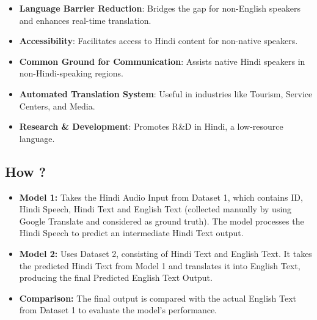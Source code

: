 \documentclass{article}
\begin{document}
\begin{itemize}
    \item \textbf{Language Barrier Reduction}: Bridges the gap for non-English speakers and enhances real-time translation.
    \item \textbf{Accessibility}: Facilitates access to Hindi content for non-native speakers.
    \item \textbf{Common Ground for Communication}: Assists native Hindi speakers in non-Hindi-speaking regions.
    \item \textbf{Automated Translation System}: Useful in industries like Tourism, Service Centers, and Media.
    \item \textbf{Research \& Development}: Promotes R\&D in Hindi, a low-resource language.
\end{itemize}

\subsection*{How ?}
\begin{itemize}
    \item \textbf{Model 1:} Takes the Hindi Audio Input from Dataset 1, which contains ID, Hindi Speech, Hindi Text and English Text (collected manually by using Google Translate and considered as ground truth). The model processes the Hindi Speech to predict an intermediate Hindi Text output. ~\cite{jia2022cvss, wang2020covost}
    \item \textbf{Model 2:} Uses Dataset 2, consisting of Hindi Text and English Text. It takes the predicted Hindi Text from Model 1 and translates it into English Text, producing the final Predicted English Text Output.~\cite{gangar2021hindi}
    \item \textbf{Comparison:} The final output is compared with the actual English Text from Dataset 1 to evaluate the model's performance.
\end{itemize}
\newpage
\end{document}
